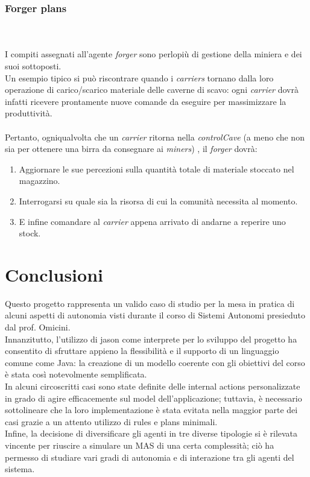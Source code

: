 \documentclass{llncs}
\begin{document}
\subsubsection{Forger plans}~\\\\
I compiti assegnati all'agente \textit{forger} sono perlopiù di gestione della miniera e dei suoi sottoposti.\\
Un esempio tipico si può riscontrare quando i \textit{carriers} tornano dalla loro operazione di carico/scarico materiale delle caverne di scavo: ogni \textit{carrier} dovrà infatti ricevere prontamente nuove comande da eseguire per massimizzare la produttività.\\\\
Pertanto, ogniqualvolta che un \textit{carrier} ritorna nella \textit{controlCave} (a meno che non sia per ottenere una birra da consegnare ai \textit{miners}) , il \textit{forger} dovrà:
\begin{enumerate}
	\item Aggiornare le sue percezioni sulla quantità totale di materiale stoccato nel magazzino.\\
	\item Interrogarsi su quale sia la risorsa di cui la comunità necessita al momento.\\
	\item E infine comandare al \textit{carrier} appena arrivato di andarne a reperire uno stock.
\end{enumerate}
\newpage
\section{Conclusioni}
Questo progetto rappresenta un valido caso di studio per la mesa in pratica di alcuni aspetti di autonomia visti durante il corso di Sistemi Autonomi presieduto dal prof. Omicini.\\
Innanzitutto, l'utilizzo di jason come interprete per lo sviluppo del progetto ha consentito di sfruttare appieno la flessibilità e il supporto di un linguaggio comune come Java: la creazione di un modello coerente con gli obiettivi del corso è stata così notevolmente semplificata.\\
In alcuni circoscritti casi sono state definite delle internal actions personalizzate in grado di agire efficacemente sul model dell'applicazione; tuttavia, è necessario sottolineare che la loro implementazione è stata evitata nella maggior parte dei casi grazie a un attento utilizzo di rules e plans minimali.\\
Infine, la decisione di diversificare gli agenti in tre diverse tipologie si è rilevata vincente per riuscire a simulare un MAS di una certa complessità; ciò ha permesso di studiare vari gradi di autonomia e di interazione tra gli agenti del sistema.
\end{document}
